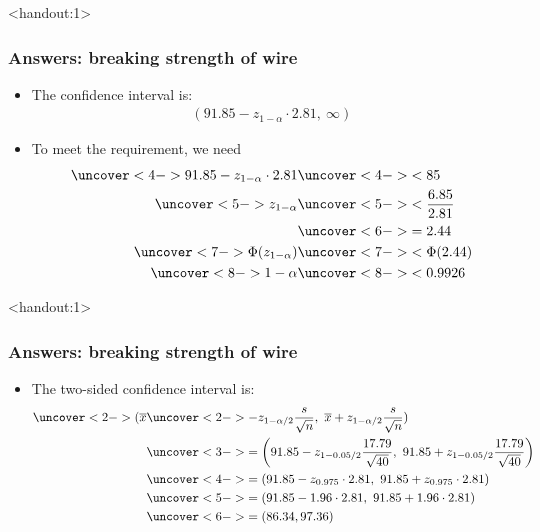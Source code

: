 \documentclass[handout]{beamer}\usepackage{graphicx, color}
\newcommand{\answers}{1}
\providecommand{\ov}[1]{\overline{#1}}
\numberwithin{equation}{section}
\begin{document}
\begin{frame}<handout:\answers>
\frametitle{Answers: breaking strength of wire} \scriptsize
\begin{itemize}
\item The confidence interval is:
\pause \begin{align*}
(91.85 - z_{1 - \alpha} \cdot 2.81, \ \infty)
\end{align*}
\pause \item To meet the requirement, we need 
\begin{align*}
\uncover<4->{91.85 - z_{1 - \alpha} \cdot 2.81} & \uncover<4->{< 85} \\
\uncover<5->{z_{1-\alpha}} & \uncover<5->{< \frac{6.85}{ 2.81}} \\
&\uncover<6->{= 2.44} \\
\uncover<7->{\Phi(z_{1 - \alpha})} & \uncover<7->{< \Phi(2.44)} \\
\uncover<8->{1 - \alpha} & \uncover<8->{< 0.9926}
\end{align*}
\end{itemize}
\end{frame}

\begin{frame}<handout:\answers>
\frametitle{Answers: breaking strength of wire}
\begin{itemize}
\item The two-sided confidence interval is:
\begin{align*}
\uncover<2->{(\ov{x}} & \uncover<2->{-z_{1 - \alpha/2} \frac{s}{\sqrt{n}}, \ \ov{x} + z_{1 - \alpha/2} \frac{s}{\sqrt{n}})} \\
&\uncover<3->{=\left (91.85 - z_{1 - 0.05/2} \frac{17.79}{\sqrt{40}}, \ 91.85 + z_{1 - 0.05/2} \frac{17.79}{\sqrt{40}} \right )} \\
&\uncover<4->{=(91.85 - z_{0.975} \cdot 2.81, \ 91.85 + z_{0.975} \cdot 2.81)} \\
&\uncover<5->{=(91.85 - 1.96\cdot 2.81, \ 91.85  + 1.96 \cdot 2.81)} \\
&\uncover<6->{=(86.34, 97.36)}
\end{align*}
\end{itemize}
\end{frame}
\end{document}
